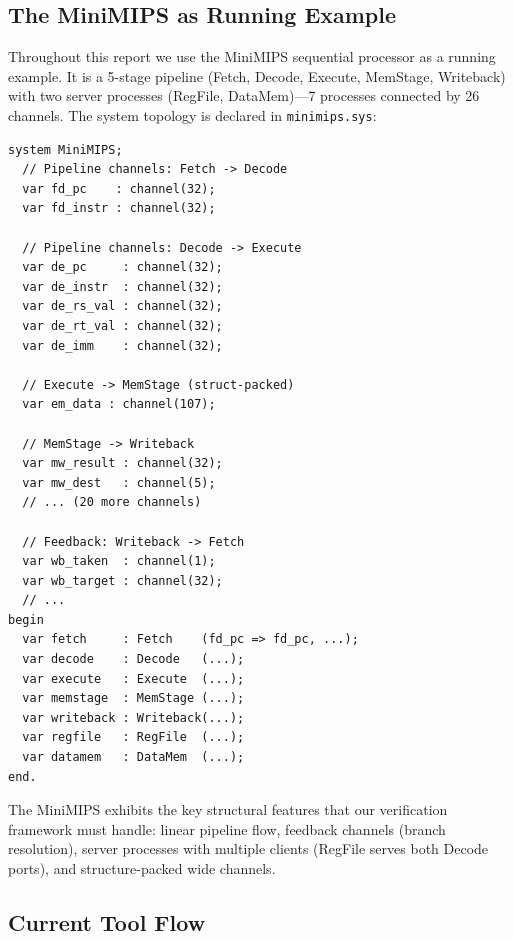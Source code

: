 \documentclass[11pt]{article}
\begin{document}
\subsection{The MiniMIPS as Running Example}
\label{sec:minimips}

Throughout this report we use the MiniMIPS sequential processor as a
running example.  It is a 5-stage pipeline (Fetch, Decode, Execute,
MemStage, Writeback) with two server processes (RegFile, DataMem)---7
processes connected by 26 channels.  The system topology is declared
in \texttt{minimips.sys}:

\begin{Verbatim}[samepage=true]
system MiniMIPS;
  // Pipeline channels: Fetch -> Decode
  var fd_pc    : channel(32);
  var fd_instr : channel(32);

  // Pipeline channels: Decode -> Execute
  var de_pc     : channel(32);
  var de_instr  : channel(32);
  var de_rs_val : channel(32);
  var de_rt_val : channel(32);
  var de_imm    : channel(32);

  // Execute -> MemStage (struct-packed)
  var em_data : channel(107);

  // MemStage -> Writeback
  var mw_result : channel(32);
  var mw_dest   : channel(5);
  // ... (20 more channels)

  // Feedback: Writeback -> Fetch
  var wb_taken  : channel(1);
  var wb_target : channel(32);
  // ...
begin
  var fetch     : Fetch    (fd_pc => fd_pc, ...);
  var decode    : Decode   (...);
  var execute   : Execute  (...);
  var memstage  : MemStage (...);
  var writeback : Writeback(...);
  var regfile   : RegFile  (...);
  var datamem   : DataMem  (...);
end.
\end{Verbatim}

The MiniMIPS exhibits the key structural features that our verification
framework must handle: linear pipeline flow, feedback channels (branch
resolution), server processes with multiple clients (RegFile serves
both Decode ports), and structure-packed wide channels.

\subsection{Current Tool Flow}
\end{document}
